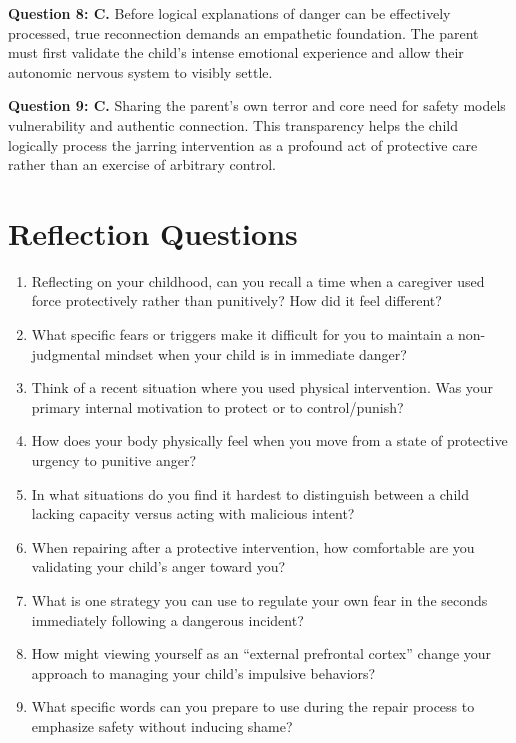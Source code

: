 \begin{practiceexercise}
\textbf{Question 8: C.} Before logical explanations of danger can be effectively processed, true reconnection demands an empathetic foundation.
The parent must first validate the child's intense emotional experience and allow their autonomic nervous system to visibly settle.
\vspace{\fill}

\textbf{Question 9: C.} Sharing the parent's own terror and core need for safety models vulnerability and authentic connection.
This transparency helps the child logically process the jarring intervention as a profound act of protective care rather than an exercise of arbitrary control.
\vspace{\fill}
\end{practiceexercise}

\newpage
\section{Reflection Questions}
\begin{reflection}
\small
\begin{enumerate}[itemsep=0pt, parsep=0pt, topsep=0pt]
  \item Reflecting on your childhood, can you recall a time when a caregiver used force protectively rather than punitively? How did it feel different?
  \item What specific fears or triggers make it difficult for you to maintain a non-judgmental mindset when your child is in immediate danger?
  \item Think of a recent situation where you used physical intervention. Was your primary internal motivation to protect or to control/punish?
  \item How does your body physically feel when you move from a state of protective urgency to punitive anger?
  \item In what situations do you find it hardest to distinguish between a child lacking capacity versus acting with malicious intent?
  \item When repairing after a protective intervention, how comfortable are you validating your child's anger toward you?
  \item What is one strategy you can use to regulate your own fear in the seconds immediately following a dangerous incident?
  \item How might viewing yourself as an ``external prefrontal cortex'' change your approach to managing your child's impulsive behaviors?
  \item What specific words can you prepare to use during the repair process to emphasize safety without inducing shame?
\end{enumerate}
\end{reflection}